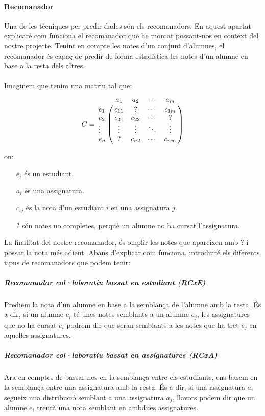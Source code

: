 \documentclass[12pt,a4paper,catalan]{article}
\begin{document}
\paragraph{Recomanador}
Una de les tècniques per predir dades són els recomanadors. En aquest apartat explicaré com funciona el recomanador que he montat possant-nos en context del nostre projecte. Tenint en compte les notes d'un conjunt d'alumnes, el recomanador és capaç de predir de forma estadística les notes d'un alumne en base a la resta dels altres.
\\
\\
Imaginem que tenim una matriu tal que:
$$
C = \bordermatrix{~ &         a_1   &    a_2   &   \cdots    &    a_m  \cr
                  e_1    &  c_{11}  &     ?    &   \cdots    &  c_{1m} \cr
                  e_2    &  c_{21}  &  c_{22}  &   \cdots    &    ?    \cr
                  \vdots &  \vdots  &  \vdots  &   \ddots    &  \vdots \cr
                  e_n    &    ?     &  c_{n2}  &   \cdots    &  c_{nm} \cr
                  }
$$

on:
\begin{itemize}[leftmargin=.5in]
	\item [$e_i$] és un estudiant.
	\item [$a_i$] és una assignatura.
	\item [$c_{ij}$] és la nota d'un estudiant $i$ en una assignatura $j$.
	\item [$?$] són notes no completes, perquè un alumne no ha cursat l'assignatura.
\end{itemize}

La finalitat del nostre recomanador, és omplir les notes que apareixen amb $?$ i possar la nota més adient. Abans d'explicar com funciona, introduiré els diferents tipus de recomanadors que podem tenir:

\subparagraph{Recomanador col·laboratiu bassat en estudiant (RCxE)}
Prediem la nota d'un alumne en base a la semblança de l'alumne amb la resta. És a dir, si un alumne $e_i$ té unes notes semblants a un alumne $e_j$, les assignatures que no ha cursat $e_i$ podrem dir que seran semblants a les notes que ha tret $e_j$ en aquelles assignatures.

\subparagraph{Recomanador col·laboratiu bassat en assignatures (RCxA)}
Ara en comptes de bassar-nos en la semblança entre els estudiants, ens basem en la semblança entre una assignatura amb la resta. És a dir, si una assignatura $a_i$ segueix una distribució semblant a una assignatura $a_j$, llavors podem dir que un alumne $e_i$ treurà una nota semblant en ambdues assignatures.
\end{document}
